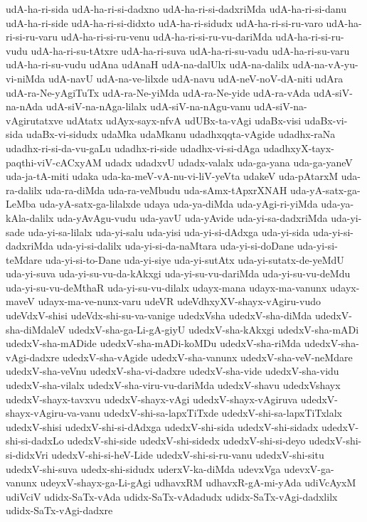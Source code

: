 {udA-ha-ri-sida
udA-ha-ri-si-dadxno
udA-ha-ri-si-dadxriMda
udA-ha-ri-si-danu
udA-ha-ri-side
udA-ha-ri-si-didxto
udA-ha-ri-sidudx
udA-ha-ri-si-ru-varo
udA-ha-ri-si-ru-varu
udA-ha-ri-si-ru-venu
udA-ha-ri-si-ru-vu-dariMda
udA-ha-ri-si-ru-vudu
udA-ha-ri-su-tAtxre
udA-ha-ri-suva
udA-ha-ri-su-vadu
udA-ha-ri-su-varu
udA-ha-ri-su-vudu
udAna
udAnaH
udA-na-dalUlx
udA-na-dalilx
udA-na-vA-yu-vi-niMda
udA-navU
udA-na-ve-lilxde
udA-navu
udA-neV-noV-dA-niti
udAra
udA-ra-Ne-yAgiTuTx
udA-ra-Ne-yiMda
udA-ra-Ne-yide
udA-ra-vAda
udA-siV-na-nAda
udA-siV-na-nAga-lilalx
udA-siV-na-nAgu-vanu
udA-siV-na-vAgirutatxve
udAtatx
udAyx-sayx-nfvA
udUBx-ta-vAgi
udaBx-visi
udaBx-vi-sida
udaBx-vi-sidudx
udaMka
udaMkanu
udadhxqqta-vAgide
udadhx-raNa
udadhx-ri-si-da-vu-gaLu
udadhx-ri-side
udadhx-vi-si-dAga
udadhxyX-tayx-paqthi-viV-cACxyAM
udadx
udadxvU
udadx-valalx
uda-ga-yana
uda-ga-yaneV
uda-ja-tA-miti
udaka
uda-ka-meV-vA-nu-vi-liV-yeVta
udakeV
uda-pAtarxM
uda-ra-dalilx
uda-ra-diMda
uda-ra-veMbudu
uda-sAmx-tApxrXNAH
uda-yA-satx-ga-LeMba
uda-yA-satx-ga-lilalxde
udaya
uda-ya-diMda
uda-yAgi-ri-yiMda
uda-ya-kAla-dalilx
uda-yAvAgu-vudu
uda-yavU
uda-yAvide
uda-yi-sa-dadxriMda
uda-yi-sade
uda-yi-sa-lilalx
uda-yi-salu
uda-yisi
uda-yi-si-dAdxga
uda-yi-sida
uda-yi-si-dadxriMda
uda-yi-si-dalilx
uda-yi-si-da-naMtara
uda-yi-si-doDane
uda-yi-si-teMdare
uda-yi-si-to-Dane
uda-yi-siye
uda-yi-sutAtx
uda-yi-sutatx-de-yeMdU
uda-yi-suva
uda-yi-su-vu-da-kAkxgi
uda-yi-su-vu-dariMda
uda-yi-su-vu-deMdu
uda-yi-su-vu-deMthaR
uda-yi-su-vu-dilalx
udayx-mana
udayx-ma-vanunx
udayx-maveV
udayx-ma-ve-nunx-varu
udeVR
udeVdhxyXV-shayx-vAgiru-vudo
udeVdxV-shisi
udeVdx-shi-su-va-vanige
udedxVsha
udedxV-sha-diMda
udedxV-sha-diMdaleV
udedxV-sha-ga-Li-gA-giyU
udedxV-sha-kAkxgi
udedxV-sha-mADi
udedxV-sha-mADide
udedxV-sha-mADi-koMDu
udedxV-sha-riMda
udedxV-sha-vAgi-dadxre
udedxV-sha-vAgide
udedxV-sha-vanunx
udedxV-sha-veV-neMdare
udedxV-sha-veVnu
udedxV-sha-vi-dadxre
udedxV-sha-vide
udedxV-sha-vidu
udedxV-sha-vilalx
udedxV-sha-viru-vu-dariMda
udedxV-shavu
udedxVshayx
udedxV-shayx-tavxvu
udedxV-shayx-vAgi
udedxV-shayx-vAgiruva
udedxV-shayx-vAgiru-va-vanu
udedxV-shi-sa-lapxTiTxde
udedxV-shi-sa-lapxTiTxlalx
udedxV-shisi
udedxV-shi-si-dAdxga
udedxV-shi-sida
udedxV-shi-sidadx
udedxV-shi-si-dadxLo
udedxV-shi-side
udedxV-shi-sidedx
udedxV-shi-si-deyo
udedxV-shi-si-didxVri
udedxV-shi-si-heV-Lide
udedxV-shi-si-ru-vanu
udedxV-shi-situ
udedxV-shi-suva
udedx-shi-sidudx
uderxV-ka-diMda
udevxVga
udevxV-ga-vanunx
udeyxV-shayx-ga-Li-gAgi
udhavxRM
udhavxR-gA-mi-yAda
udiVcAyxM
udiVciV
udidx-SaTx-vAda
udidx-SaTx-vAdadudx
udidx-SaTx-vAgi-dadxlilx
udidx-SaTx-vAgi-dadxre
}

